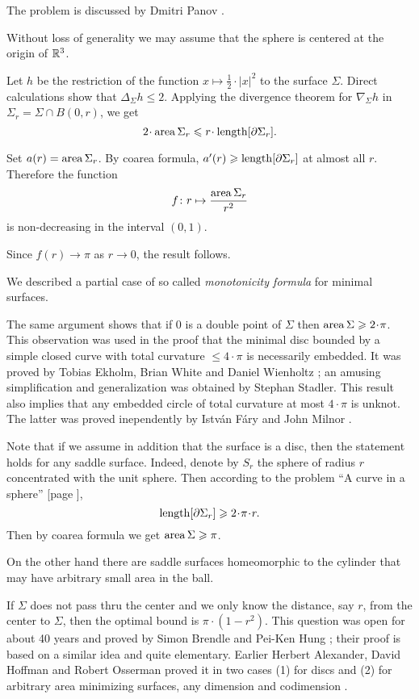 The problem is discussed by Dmitri Panov \cite[see][]{panov-curves}.

Without loss of generality we may assume that the sphere is centered at the origin of $\mathbb{R}^3$.

Let $h$ be the restriction of the function $x\mapsto \tfrac12\cdot|x|^2$ to the surface $\Sigma$.
Direct calculations show that $\Delta_\Sigma h\le 2$.
Applying the divergence theorem for $\nabla_\Sigma h$
in $\Sigma_r=\Sigma\cap B(0,r)$, we get
\[2\cdot \area\Sigma_r\le r\cdot\length [\partial\Sigma_r].\]

Set $a(r)=\operatorname{\rm area}\nolimits\Sigma_r$.
By coarea formula, $a'(r)\geqslant\operatorname{\rm length} [\partial\Sigma_r]$ at almost all $r$.
Therefore the function
\[f\colon r\mapsto \frac{\operatorname{\rm area}\nolimits\Sigma_r}{r^2}
\]
is non-decreasing in the interval $(0,1)$.

Since $f(r)\to \pi$ as $r\to0$, the result follows.\qeds

We described a partial case of so called \emph{monotonicity formula} for minimal surfaces.

The same argument shows that if $0$ is a double point
of $\Sigma$ then $\area\Sigma\ge 2\cdot \pi$.
This observation was used in the proof 
that the minimal disc bounded by a simple closed curve with total curvature $\le 4\cdot\pi$ 
is necessarily embedded.
It was proved by 
Tobias Ekholm, 
Brian White 
and Daniel Wienholtz
\cite[see][]{EWW};
an amusing simplification and generalization
was obtained by 
Stephan Stadler. %
This result also implies that any embedded circle of total curvature at most $4\cdot\pi$ is unknot.
The latter was proved inependently by Istv{\'a}n F{\'a}ry \cite[see][]{fary-knot} and  John Milnor \cite[see][]{milnor}.

Note that if we assume in addition that the surface is a disc,
then the statement holds for any saddle surface. 
Indeed, denote by $S_r$ the sphere of radius $r$ concentrated with the unit sphere. 
Then according to the problem ``A curve in a sphere'' [page \pageref{A curve in a sphere}], 
\[\length[\partial\Sigma_r]\ge 2\cdot\pi\cdot r.\]
Then by coarea formula we get $\operatorname{\rm area}\nolimits\Sigma\geqslant \pi$.

On the other hand there are saddle surfaces homeomorphic to the cylinder
that may have arbitrary small area in the ball. 

If $\Sigma$ does not pass thru the center 
and we only know the distance, say $r$, 
from the center to $\Sigma$,
then the optimal bound is $\pi\cdot(1-r^2)$.
This question was open for about 40 years and proved by Simon Brendle and Pei-Ken Hung \cite[see][]{brende-hung};
their proof is based on a similar idea and quite elementary.
Earlier Herbert Alexander, 
David Hoffman
and Robert Osserman 
proved it in two cases (1) for discs and (2) for arbitrary area minimizing surfaces, any dimension and codimension
 \cite[see][]{alexander-osserman,alexander-hoffman-osserman}.






